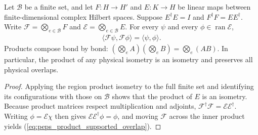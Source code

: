 \begin{lemma}%
    \label{thm:peps_physical_product_supported_isometry}
    \leanok
    Let $\mathcal B$ be a finite set, and let $F:H\to H'$ and
    $E:K\to H$ be linear maps between finite-dimensional complex
    Hilbert spaces. Suppose $E^\dagger E=I$ and
    $F^\dagger F=EE^\dagger$. Write
    $\mathcal F=\bigotimes_{e\in\mathcal B}F$ and
    $\mathcal E=\bigotimes_{e\in\mathcal B}E$.
    For every $\psi$ and every $\phi\in\operatorname{ran}\mathcal E$,
    \begin{align}
        \langle\mathcal F\psi,\mathcal F\phi\rangle
        =\langle\psi,\phi\rangle.
        \label{eq:peps_product_supported_overlap}
    \end{align}
    Products compose bond by bond: $(\bigotimes_e A)(\bigotimes_e B)
        =\bigotimes_e(AB)$. In particular, the product of any physical isometry is an isometry
    and preserves all physical overlaps.
\end{lemma}
\begin{proof}\leanok
    Applying the region product isometry to the full finite set and
    identifying its configurations with those on $\mathcal B$ shows that the
    product of $E$ is an isometry. Because product matrices respect
    multiplication and adjoints,
    $\mathcal F^\dagger\mathcal F=\mathcal E\mathcal E^\dagger$.
    Writing $\phi=\mathcal E\chi$ then gives
    $\mathcal E\mathcal E^\dagger\phi=\phi$, and moving
    $\mathcal F$ across the inner product yields
    (\ref{eq:peps_product_supported_overlap}).
\end{proof}

